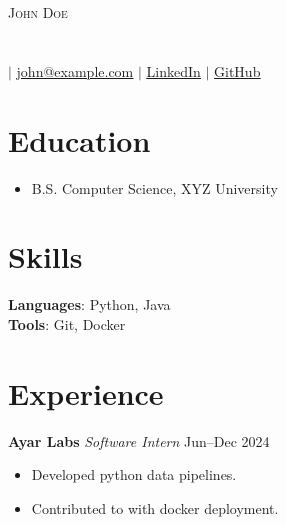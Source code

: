 \documentclass[letterpaper,10pt]{article}
\begin{document}
\begin{center}
{\Huge \scshape John Doe}\\[-1pt]
\small \\
\textit{}\\
\small  $|$ \href{mailto:john@example.com}{\underline{john@example.com}} $|$ 
\href{}{\underline{LinkedIn}} $|$ 
\href{}{\underline{GitHub}}
\end{center}

\section{Education}
\begin{itemize}
\item B.S. Computer Science, XYZ University
\end{itemize}

\section{Skills}
\textbf{Languages}: Python, Java \\
\textbf{Tools}: Git, Docker \\

\section{Experience}
\textbf{Ayar Labs} \hfill \textit{Software Intern} \hfill Jun–Dec 2024
\begin{itemize}
\item Developed python data pipelines.
\item Contributed to with docker deployment.
\end{itemize}
\end{document}
